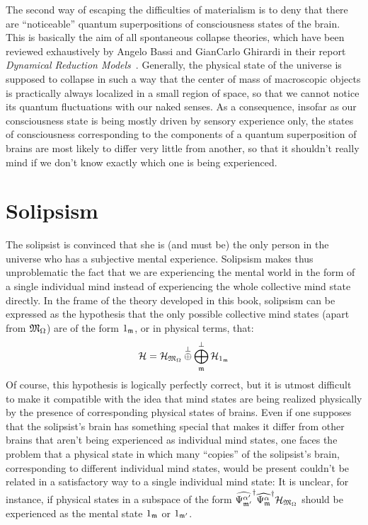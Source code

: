 \documentclass[10pt,a4paper,twoside,openany]{book}
\begin{document}
The second way of escaping the difficulties of materialism is to deny that there are ``noticeable'' quantum superpositions of consciousness states of the brain. This is basically the aim of all spontaneous collapse theories, which have been reviewed exhaustively by Angelo Bassi and GianCarlo Ghirardi in their report \textit{Dynamical Reduction Models}~\cite{Bassi2003}. Generally, the physical state of the universe is supposed to collapse in such a way that the center of mass of macroscopic objects is practically always localized in a small region of space, so that we cannot notice its quantum fluctuations with our naked senses. As a consequence, insofar as our consciousness state is being mostly driven by sensory experience only, the states of consciousness corresponding to the components of a quantum superposition of brains are most likely to differ very little from another, so that it shouldn't really mind if we don't know exactly which one is being experienced.

\section{Solipsism}

The solipsist is convinced that she is (and must be) the only person in the universe who has a subjective mental experience. Solipsism makes thus unproblematic the fact that we are experiencing the mental world in the form of a single individual mind instead of experiencing the whole collective mind state directly. In the frame of the theory developed in this book, solipsism can be expressed as the hypothesis that the only possible collective mind states (apart from $\mathfrak{M}_\Omega$) are of the form ${1}_{\mathfrak{m}}$, or in physical terms, that:
\begin{equation*}
\mathcal H = \mathcal H_{\mathfrak{M}_\Omega} \overset{\perp}{\oplus} \bigoplus_{\mathfrak{m}}^\perp \mathcal H_{{1}_{\mathfrak{m}}}
\end{equation*}
Of course, this hypothesis is logically perfectly correct, but it is utmost difficult to make it compatible with the idea that mind states are being realized physically by the presence of corresponding physical states of brains. Even if one supposes that the solipsist's brain has something special that makes it differ from other brains that aren't being experienced as individual mind states, one faces the problem that a physical state in which many ``copies'' of the solipsist's brain, corresponding to different individual mind states, would be present couldn't be related in a satisfactory way to a single individual mind state: It is unclear, for instance, if physical states in a subspace of the form $\widehat{\Psi_{\mathfrak{m}'}^{\alpha'}}^{\dagger} \widehat{\Psi_{\mathfrak{m}}^\alpha}^{\dagger} \mathcal H_{\mathfrak{M}_\Omega}$ should be experienced as the mental state ${1}_{\mathfrak{m}}$ or ${1}_{\mathfrak{m}'}$.
\end{document}
